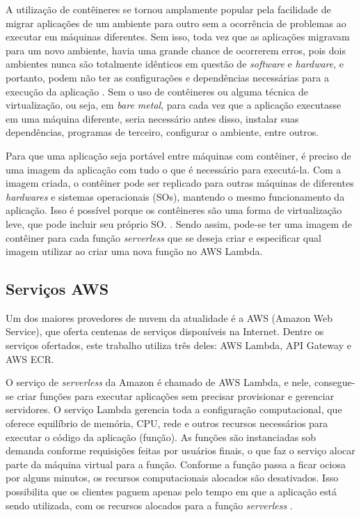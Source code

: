 \documentclass[conference]{IEEEtran}
\begin{document}
A utilização de contêineres se tornou amplamente popular pela facilidade de migrar aplicações de um ambiente para outro sem a ocorrência de problemas ao executar em máquinas diferentes. Sem isso, toda vez que as aplicações migravam para um novo ambiente, havia uma grande chance de ocorrerem erros, pois dois ambientes nunca são totalmente idênticos em questão de \textit{software} e \textit{hardware}, e portanto, podem não ter as configurações e dependências necessárias para a execução da aplicação  \cite{Siddiqui_2019_analysis_container}. Sem o uso de contêineres ou alguma técnica de virtualização, ou seja, em \textit{bare metal}, para cada vez que a aplicação executasse em uma máquina diferente, seria necessário antes disso, instalar suas dependências, programas de terceiro, configurar o ambiente, entre outros.

Para que uma aplicação seja portável entre máquinas com contêiner, é preciso de uma imagem da aplicação com tudo o que é necessário para executá-la. Com a imagem criada, o contêiner pode ser replicado para outras máquinas de diferentes \textit{hardwares} e sistemas operacionais (SOs), mantendo o mesmo funcionamento da aplicação. Isso é possível porque os contêineres são uma forma de virtualização leve, que pode incluir seu próprio SO. \cite{scheepers_2014_virtualization_containerization}. Sendo assim, pode-se ter uma imagem de contêiner para cada função \textit{serverless} que se deseja criar e especificar qual imagem utilizar ao criar uma nova função no AWS Lambda. 


\subsection{Serviços AWS}
\label{subsec:aws_services}

Um dos maiores provedores de nuvem da atualidade é a AWS (Amazon Web Service), que oferta centenas de serviços disponíveis na Internet. Dentre os serviços ofertados, este trabalho utiliza três deles: AWS Lambda, API Gateway e AWS ECR.

O serviço de \textit{serverless} da Amazon é chamado de AWS Lambda, e nele, consegue-se criar funções para executar aplicações sem precisar provisionar e gerenciar servidores. 
O serviço Lambda gerencia toda a configuração computacional, que oferece equilíbrio de memória, CPU, rede e outros recursos necessários para executar o código da aplicação (função).
As funções são instanciadas sob demanda conforme requisições feitas por usuários finais, o que faz o serviço alocar parte da máquina virtual para a função. Conforme a função passa a ficar ociosa por alguns minutos, os recursos computacionais alocados são desativados. Isso possibilita que os clientes paguem apenas pelo tempo em que a aplicação está sendo utilizada, com os recursos alocados para a função \textit{serverless} \cite{aws_2023_what_is_lambda}.
\end{document}
